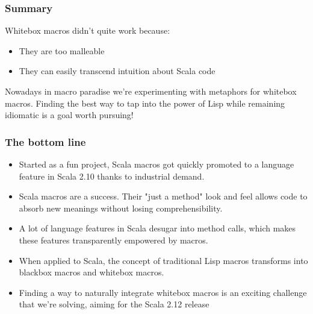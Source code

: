 \documentclass[svgnames,hyperref={bookmarks=false}]{beamer}
\begin{document}
\begin{frame}[fragile]
\frametitle{Summary}

Whitebox macros didn't quite work because:
\begin{itemize}
\item They are too malleable
\item They can easily transcend intuition about Scala code
\end{itemize}

\vskip25pt
Nowadays in macro paradise we're experimenting with metaphors for whitebox macros.
Finding the best way to tap into the power of Lisp while remaining idiomatic is
a goal worth pursuing!
\end{frame}

\begin{frame}[fragile]
\frametitle{}

\vskip40pt
\begin{center}
\end{center}
\end{frame}

\begin{frame}[fragile]
\frametitle{The bottom line}

\begin{itemize}
\item Started as a fun project, Scala macros got quickly promoted to a language feature
in Scala 2.10 thanks to industrial demand.
\item Scala macros are a success. Their "just a method" look and feel allows code
to absorb new meanings without losing comprehensibility.
\item A lot of language features in Scala desugar into method calls, which makes these
features transparently empowered by macros.
\item When applied to Scala, the concept of traditional Lisp macros
transforms into blackbox macros and whitebox macros.
\item Finding a way to naturally integrate whitebox macros is an exciting
challenge that we're solving, aiming for the Scala 2.12 release
\end{itemize}
\end{frame}

\begin{frame}[fragile]
\frametitle{}

\vskip40pt
\begin{center}
\end{center}
\end{frame}
\end{document}
